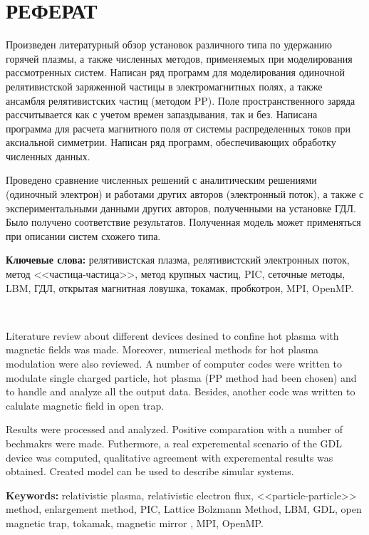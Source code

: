 \chapter*{РЕФЕРАТ}             %

Произведен литературный обзор установок различного типа по удержанию горячей плазмы, а также численных методов, применяемых при моделирования рассмотренных систем. Написан ряд программ для моделирования одиночной релятивистской заряженной частицы в электромагнитных полях, а также ансамбля релятивистских частиц (методом PP). Поле пространственного заряда рассчитывается как с учетом времен запаздывания, так и без. Написана программа для расчета магнитного поля от системы распределенных токов при аксиальной симметрии. Написан ряд программ, обеспечивающих обработку численных данных.

Проведено сравнение численных решений с аналитическим решениями (одиночный электрон) и работами других авторов (электронный поток), а также с экспериментальными данными других авторов, полученными на установке ГДЛ. Было получено соответствие результатов.
Полученная модель может применяться при описании систем схожего типа.

\textbf{Ключевые слова:} релятивистская плазма, релятивистский электронных поток, метод <<частица-частица>>, метод крупных частиц, PIC, сеточные методы, LBM, ГДЛ, открытая магнитная ловушка, токамак, пробкотрон, MPI, OpenMP.

\ 

Literature review about different devices desined to confine hot plasma with magnetic fields was made. Moreover, numerical methods for hot plasma modulation were also reviewed. A number of computer codes were written to modulate single charged particle, hot plasma (PP method had been chosen) and to handle and analyze all the output data. Besides, another code was written to calulate magnetic field in open trap.

Results were processed and analyzed. Positive comparation with a number of bechmakrs were made. Futhermore, a real experemental scenario of the GDL device was computed, qualitative agreement with experemental results was obtained.
Created model can be used to describe simular systems.


\textbf{Keywords:} relativistic plasma, relativistic electron flux, <<particle-particle>> method, enlargement method, PIC, Lattice Bolzmann Method, LBM, GDL, open magnetic trap, tokamak, magnetic mirror , MPI, OpenMP.